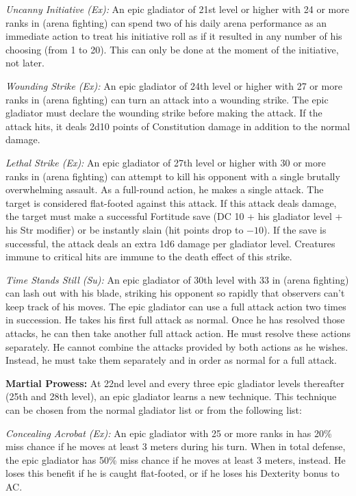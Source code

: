 \textit{Uncanny Initiative (Ex):} An epic gladiator of 21st level or higher with 24 or more ranks in  (arena fighting) can spend two of his daily arena performance as an immediate action to treat his initiative roll as if it resulted in any number of his choosing (from 1 to 20). This can only be done at the moment of the initiative, not later.

\textit{Wounding Strike (Ex):} An epic gladiator of 24th level or higher with 27 or more ranks in  (arena fighting) can turn an attack into a wounding strike. The epic gladiator must declare the wounding strike before making the attack. If the attack hits, it deals 2d10 points of Constitution damage in addition to the normal damage.

\textit{Lethal Strike (Ex):}  An epic gladiator of 27th level or higher with 30 or more ranks in  (arena fighting) can attempt to kill his opponent with a single brutally overwhelming assault. As a full-round action, he makes a single attack. The target is considered flat-footed against this attack. If this attack deals damage, the target must make a successful Fortitude save (DC 10 + \onehalf his gladiator level + his Str modifier) or be instantly slain (hit points drop to $-10$). If the save is successful, the attack deals an extra 1d6 damage per gladiator level. Creatures immune to critical hits are immune to the death effect of this strike.

\textit{Time Stands Still (Su):} An epic gladiator of 30th level with 33 in  (arena fighting) can lash out with his blade, striking his opponent so rapidly that observers can't keep track of his moves. The epic gladiator can use a full attack action two times in succession. He takes his first full attack as normal. Once he has resolved those attacks, he can then take another full attack action. He must resolve these actions separately. He cannot combine the attacks provided by both actions as he wishes. Instead, he must take them separately and in order as normal for a full attack.

\textbf{Martial Prowess:} At 22nd level and every three epic gladiator levels thereafter (25th and 28th level), an epic gladiator learns a new technique. This technique can be chosen from the normal gladiator list or from the following list:

\textit{Concealing Acrobat (Ex):} An epic gladiator with 25 or more ranks in  has 20\% miss chance if he moves at least 3 meters during his turn. When in total defense, the epic gladiator has 50\% miss chance if he moves at least 3 meters, instead. He loses this benefit if he is caught flat-footed, or if he loses his Dexterity bonus to AC.


